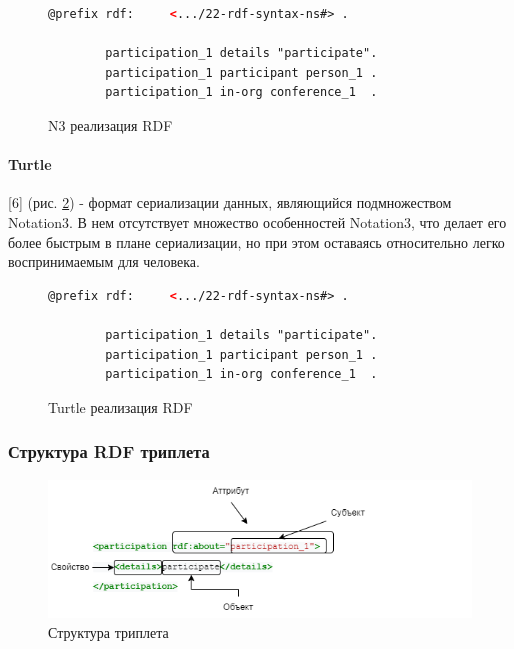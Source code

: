 \documentclass[12pt]{article}
\begin{document}
\begin{figure}[!ht]
    \begin{lstlisting}[language=XML]
        @prefix rdf:     <.../22-rdf-syntax-ns#> .

        participation_1 details "participate".
        participation_1 participant person_1 .
        participation_1 in-org conference_1  .
    \end{lstlisting}
    \caption{N3 реализация RDF}
    \label{lst:n3_rdf}
\end{figure}

\pagebreak

\paragraph{Turtle} [6] (рис. \ref{lst:ttl_rdf}) - формат сериализации данных, являющийся подмножеством Notation3. В нем отсутствует множество особенностей Notation3, что делает его более быстрым в плане сериализации, но при этом оставаясь относительно легко воспринимаемым для человека.

\begin{figure}[!ht]
    \begin{lstlisting}[language=XML]
        @prefix rdf:     <.../22-rdf-syntax-ns#> .

        participation_1 details "participate".
        participation_1 participant person_1 .
        participation_1 in-org conference_1  .
    \end{lstlisting}
    \caption{Turtle реализация RDF}
    \label{lst:ttl_rdf}
\end{figure}

\subsubsection{Структура RDF триплета}
\hphantom{text}
\begin{figure}[!ht]
    \includegraphics[width=1\textwidth]{_images/rdf_eric_razbor.png}
    \caption{Структура триплета}
    \label{fig:rdf_deconstruction}
\end{figure}
\end{document}
